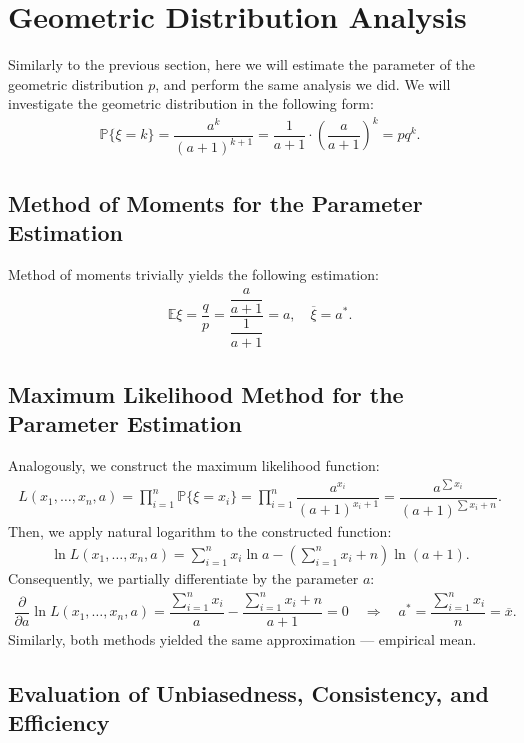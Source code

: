 \documentclass[final,3p,times,onecolumn]{elsarticle}
\begin{document}
\section{Geometric Distribution Analysis} 
Similarly to the previous section, here we will estimate the parameter of the geometric distribution $p$,
and perform the same analysis we did.
We will investigate the geometric distribution in the following form: 
\begin{gather*}
\mathbb{P}\{\xi = k \} = \dfrac{a^k}{(a+1)^{k+1}} = 
\dfrac{1}{a+1} \cdot \left(\dfrac{a}{a+1}\right)^k = pq^k.
\end{gather*}

\subsection{Method of Moments for the Parameter Estimation}
Method of moments trivially yields the following estimation:
\begin{gather*}
\mathbb{E}\xi = \dfrac{q}{p} = \dfrac{\dfrac{a}{a+1}}{\dfrac{1}{a+1}} =
a, \quad \overline{\xi} = a^*.
\end{gather*}

\subsection{Maximum Likelihood Method for the Parameter Estimation}
Analogously, we construct the maximum likelihood function: 
\begin{gather*}
L(x_1, \ldots, x_n, a) = \prod\limits_{i = 1}^{n}\mathbb{P}\{ \xi = x_i \} = 
\prod\limits_{i = 1}^{n} \dfrac{a^{x_i}}{(a+1)^{x_i +1}} = 
\dfrac{a^{\sum x_i}}{(a+1)^{\sum x_i + n}}.
\end{gather*}
Then, we apply natural logarithm to the constructed function:
\begin{gather*}
\ln L(x_1, \ldots, x_n, a) =
 \sum\limits_{i = 1}^n x_i \ln a - \left(\sum\limits_{i = 1}^n x_i + n \right)\ln(a + 1).
\end{gather*}
Consequently, we partially differentiate by the parameter $a$:  
\begin{gather*}
\dfrac{\partial}{\partial a}\ln L(x_1, \ldots, x_n, a)
=
\dfrac{\sum_{i=1}^n x_i}{a}
-
\dfrac{\sum_{i=1}^n x_i + n}{a+1}
= 0
\quad \Longrightarrow \quad
a^* = \dfrac{\sum_{i=1}^n x_i}{n} = \overline{x}.
\end{gather*}
Similarly, both methods yielded the same approximation --- empirical mean. 

\subsection{Evaluation of Unbiasedness, Consistency, and Efficiency}
\end{document}
